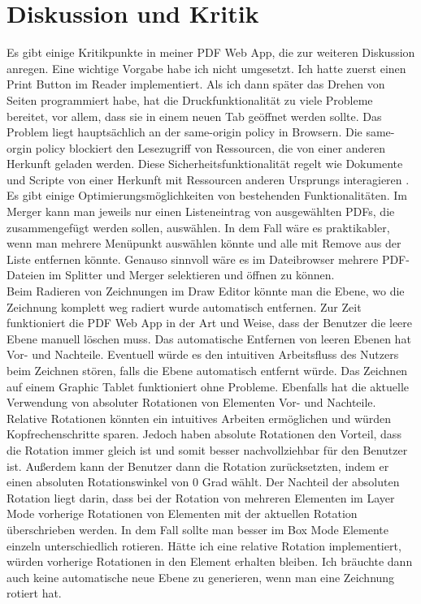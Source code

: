 \chapter{Diskussion und Kritik}
Es gibt einige Kritikpunkte in meiner PDF Web App, die zur weiteren Diskussion anregen. Eine wichtige Vorgabe habe ich nicht umgesetzt. Ich hatte zuerst einen Print Button im Reader implementiert. Als ich dann später das Drehen von Seiten programmiert habe, hat die Druckfunktionalität zu viele Probleme bereitet, vor allem, dass sie in einem neuen Tab geöffnet werden sollte. Das Problem liegt hauptsächlich an der same-origin policy in Browsern. Die same-orgin policy blockiert den Lesezugriff von Ressourcen, die von einer anderen Herkunft geladen werden. Diese Sicherheitsfunktionalität regelt wie Dokumente und Scripte von einer Herkunft mit Ressourcen anderen Ursprungs interagieren \cite{same-origin}. Es gibt einige Optimierungsmöglichkeiten von bestehenden Funktionalitäten. Im Merger kann man jeweils nur einen Listeneintrag von ausgewählten PDFs, die zusammengefügt werden sollen, auswählen. In dem Fall wäre es praktikabler, wenn man mehrere Menüpunkt auswählen könnte und alle mit Remove aus der Liste entfernen könnte. Genauso sinnvoll wäre es im Dateibrowser mehrere PDF-Dateien im Splitter und Merger selektieren und öffnen zu können. \\
Beim Radieren von Zeichnungen im Draw Editor könnte man die Ebene, wo die Zeichnung komplett weg radiert wurde automatisch entfernen. Zur Zeit funktioniert die PDF Web App in der Art und Weise, dass der Benutzer die leere Ebene manuell löschen muss. Das automatische Entfernen von leeren Ebenen hat Vor- und Nachteile. Eventuell würde es den intuitiven Arbeitsfluss des Nutzers beim Zeichnen stören, falls die Ebene automatisch entfernt würde. Das Zeichnen auf einem Graphic Tablet funktioniert ohne Probleme. Ebenfalls hat die aktuelle Verwendung von absoluter Rotationen von Elementen Vor- und Nachteile. Relative Rotationen könnten ein intuitives Arbeiten ermöglichen und würden Kopfrechenschritte sparen. Jedoch haben absolute Rotationen den Vorteil, dass die Rotation immer gleich ist und somit besser nachvollziehbar für den Benutzer ist. Außerdem kann der Benutzer dann die Rotation zurücksetzten, indem er einen absoluten Rotationswinkel von 0 Grad wählt. Der Nachteil der absoluten Rotation liegt darin, dass bei der Rotation von mehreren Elementen im Layer Mode vorherige Rotationen von Elementen mit der aktuellen Rotation überschrieben werden. In dem Fall sollte man besser im Box Mode Elemente einzeln unterschiedlich rotieren. Hätte ich eine relative Rotation implementiert, würden vorherige Rotationen in den Element erhalten bleiben. Ich bräuchte dann auch keine automatische neue Ebene zu generieren, wenn man eine Zeichnung rotiert hat. 

